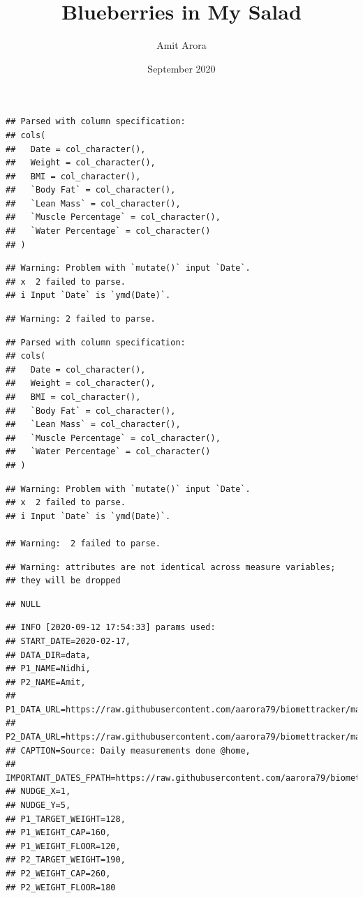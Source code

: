 \documentclass[oneside]{book}
\title{Blueberries in My Salad}
\author{Amit Arora}
\date{September 2020}
\begin{document}
\maketitle

{
\hypersetup{linkcolor=black}
\setcounter{tocdepth}{1}
\tableofcontents
}
\begin{verbatim}
## Parsed with column specification:
## cols(
##   Date = col_character(),
##   Weight = col_character(),
##   BMI = col_character(),
##   `Body Fat` = col_character(),
##   `Lean Mass` = col_character(),
##   `Muscle Percentage` = col_character(),
##   `Water Percentage` = col_character()
## )
\end{verbatim}

\begin{verbatim}
## Warning: Problem with `mutate()` input `Date`.
## x  2 failed to parse.
## i Input `Date` is `ymd(Date)`.
\end{verbatim}

\begin{verbatim}
## Warning: 2 failed to parse.
\end{verbatim}

\begin{verbatim}
## Parsed with column specification:
## cols(
##   Date = col_character(),
##   Weight = col_character(),
##   BMI = col_character(),
##   `Body Fat` = col_character(),
##   `Lean Mass` = col_character(),
##   `Muscle Percentage` = col_character(),
##   `Water Percentage` = col_character()
## )
\end{verbatim}

\begin{verbatim}
## Warning: Problem with `mutate()` input `Date`.
## x  2 failed to parse.
## i Input `Date` is `ymd(Date)`.

## Warning:  2 failed to parse.
\end{verbatim}

\begin{verbatim}
## Warning: attributes are not identical across measure variables;
## they will be dropped
\end{verbatim}

\begin{verbatim}
## NULL
\end{verbatim}

\begin{verbatim}
## INFO [2020-09-12 17:54:33] params used:
## START_DATE=2020-02-17,
## DATA_DIR=data,
## P1_NAME=Nidhi,
## P2_NAME=Amit,
## P1_DATA_URL=https://raw.githubusercontent.com/aarora79/biomettracker/master/data/Nidhi.csv,
## P2_DATA_URL=https://raw.githubusercontent.com/aarora79/biomettracker/master/data/Amit.csv,
## CAPTION=Source: Daily measurements done @home,
## IMPORTANT_DATES_FPATH=https://raw.githubusercontent.com/aarora79/biomettracker/master/data/important_dates.csv,
## NUDGE_X=1,
## NUDGE_Y=5,
## P1_TARGET_WEIGHT=128,
## P1_WEIGHT_CAP=160,
## P1_WEIGHT_FLOOR=120,
## P2_TARGET_WEIGHT=190,
## P2_WEIGHT_CAP=260,
## P2_WEIGHT_FLOOR=180
\end{verbatim}
\end{document}
